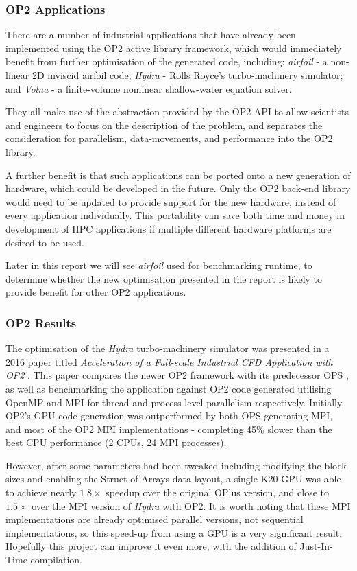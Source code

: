 \subsubsection{OP2 Applications}
There are a number of industrial applications that have already been implemented using the OP2 active library framework, which would immediately benefit from further optimisation of the generated code, including: \textit{airfoil} \cite{airfoil} - a non-linear 2D inviscid airfoil code; \textit{Hydra} \cite{hydra} - Rolls Royce’s turbo-machinery simulator; and \textit{Volna} \cite{volna} - a finite-volume nonlinear shallow-water equation solver.
\par
They all make use of the abstraction provided by the OP2 API to allow scientists and engineers to focus on the description of the problem, and separates the consideration for parallelism, data-movements, and performance into the OP2 library.
\par
A further benefit is that such applications can be ported onto a new generation of hardware, which could be developed in the future. Only the OP2 back-end library would need to be updated to provide support for the new hardware, instead of every application individually. This portability can save both time and money in development of HPC applications if multiple different hardware platforms are desired to be used.
\par
Later in this report we will see \textit{airfoil} used for benchmarking runtime, to determine whether the new optimisation presented in the report is likely to provide benefit for other OP2 applications.

\subsubsection{OP2 Results}
\label{sss:op2res}
The optimisation of the \textit{Hydra} turbo-machinery simulator was presented in a 2016 paper titled \textit{Acceleration of a Full-scale Industrial CFD Application with OP2} \cite{hydrapaper}. This paper compares the newer OP2 framework with its predecessor OPS \cite{ops}, as well as benchmarking the application against OP2 code generated utilising OpenMP \cite{OpenMP} and MPI \cite{MPI} for thread and process level parallelism respectively. Initially, OP2's GPU code generation was outperformed by both OPS generating MPI, and most of the OP2 MPI implementations - completing 45\% slower than the best CPU performance (2 CPUs, 24 MPI processes).
\par However, after some parameters had been tweaked including modifying the block sizes and enabling the Struct-of-Arrays data layout, a single K20 GPU was able to achieve nearly $1.8\times$ speedup over the original OPlus version, and close to $1.5\times$ over the MPI version of \textit{Hydra} with OP2. It is worth noting that these MPI implementations are already optimised parallel versions, not sequential implementations, so this speed-up from using a GPU is a very significant result. Hopefully this project can improve it even more, with the addition of Just-In-Time compilation.
\clearpage

